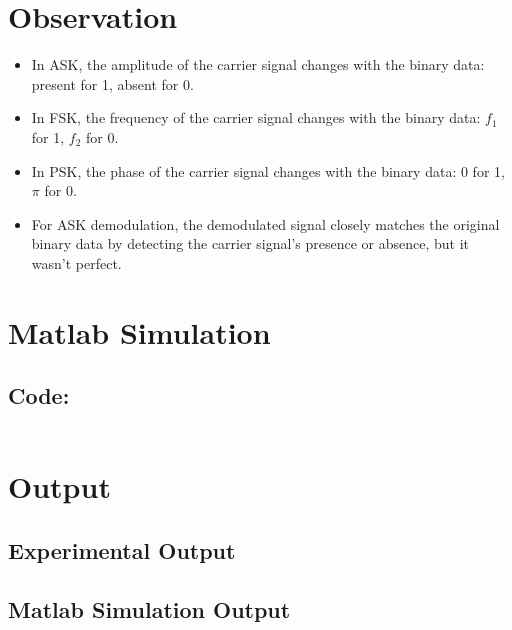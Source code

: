 \documentclass[12pt]{article}
\begin{document}
\section*{Observation}
\begin{itemize}
    \item In ASK, the amplitude of the carrier signal changes with the binary data: present for 1, absent for 0.
    \item In FSK, the frequency of the carrier signal changes with the binary data: \( f_1 \) for 1, \( f_2 \) for 0.
    \item In PSK, the phase of the carrier signal changes with the binary data: 0 for 1, \( \pi \) for 0.
    \item For ASK demodulation, the demodulated signal closely matches the original binary data by detecting the carrier signal's presence or absence, but it wasn't perfect.
\end{itemize}


\section*{Matlab Simulation}

\subsection*{Code:}
\inputminted[linenos,breaklines,breakanywhere]{matlab}{./assets/dsk.m}

\section*{Output}

\subsection*{Experimental Output}


\subsection*{Matlab Simulation Output}
% 
\end{document}
